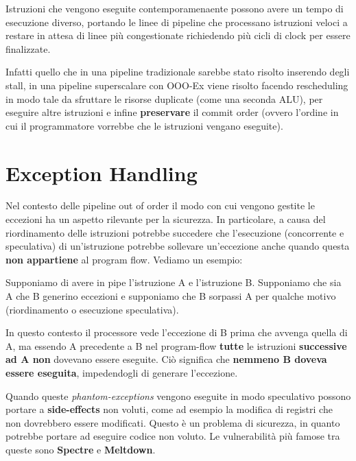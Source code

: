 \begin{problem}\label{prob:itsp}
    Istruzioni che vengono eseguite contemporamenaente possono avere un tempo di esecuzione diverso, portando le linee di pipeline che processano istruzioni veloci a restare in attesa di linee più congestionate richiedendo più cicli di clock per essere finalizzate.
\end{problem}
Infatti quello che in una pipeline tradizionale sarebbe stato risolto inserendo degli stall, in una pipeline superscalare con OOO-Ex viene risolto facendo rescheduling in modo tale da sfruttare le risorse duplicate (come una seconda ALU), per eseguire altre istruzioni e infine \textbf{preservare} il commit order (ovvero l'ordine in cui il programmatore vorrebbe che le istruzioni vengano eseguite).

\section{Exception Handling}\label{sec:excep}
Nel contesto delle pipeline out of order il modo con cui vengono gestite le eccezioni ha un aspetto rilevante per la sicurezza. In particolare, a causa del riordinamento delle istruzioni potrebbe succedere che l'esecuzione (concorrente e speculativa) di un'istruzione potrebbe sollevare un'eccezione anche quando questa \textbf{non appartiene} al program flow. Vediamo un esempio:
\begin{example}\label{ex:phantom_excep}
    Supponiamo di avere in pipe l'istruzione A e l'istruzione B. Supponiamo che sia A che B generino eccezioni e supponiamo che B sorpassi A per qualche motivo (riordinamento o esecuzione speculativa).

    In questo contesto il processore vede l'eccezione di B prima che avvenga quella di A, ma essendo A precedente a B nel program-flow \textbf{tutte} le istruzioni \textbf{successive ad A non} dovevano essere eseguite. Ciò significa che \textbf{nemmeno B doveva essere eseguita}, impedendogli di generare l'eccezione.
\end{example}
Quando queste \textit{phantom-exceptions} vengono eseguite in modo speculativo possono portare a \textbf{side-effects} non voluti, come ad esempio la modifica di registri che non dovrebbero essere modificati. Questo è un problema di sicurezza, in quanto potrebbe portare ad eseguire codice non voluto. Le vulnerabilità più famose tra queste sono \textbf{Spectre} e \textbf{Meltdown}.